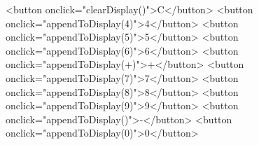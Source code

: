 \documentclass[
  letterpaper,
]{book}
\newenvironment{Shaded}{\begin{snugshade}}{\end{snugshade}}
\newcommand{\DataTypeTok}[1]{\textcolor[rgb]{0.68,0.00,0.00}{#1}}
\newcommand{\ErrorTok}[1]{\textcolor[rgb]{0.68,0.00,0.00}{#1}}
\newcommand{\KeywordTok}[1]{\textcolor[rgb]{0.00,0.23,0.31}{#1}}
\newcommand{\NormalTok}[1]{\textcolor[rgb]{0.00,0.23,0.31}{#1}}
\newcommand{\OtherTok}[1]{\textcolor[rgb]{0.00,0.23,0.31}{#1}}
\newcommand{\StringTok}[1]{\textcolor[rgb]{0.13,0.47,0.30}{#1}}
\begin{document}
\begin{tcolorbox}
\begin{Shaded}
\begin{Highlighting}[]
      \DataTypeTok{\textless{}}\KeywordTok{button} \ErrorTok{onclick}\OtherTok{=}\StringTok{"clearDisplay()"}\DataTypeTok{\textgreater{}}\NormalTok{C}\DataTypeTok{\textless{}/}\KeywordTok{button}\DataTypeTok{\textgreater{}}
      \DataTypeTok{\textless{}}\KeywordTok{button} \ErrorTok{onclick}\OtherTok{=}\StringTok{"appendToDisplay(\textquotesingle{}4\textquotesingle{})"}\DataTypeTok{\textgreater{}}\NormalTok{4}\DataTypeTok{\textless{}/}\KeywordTok{button}\DataTypeTok{\textgreater{}}
      \DataTypeTok{\textless{}}\KeywordTok{button} \ErrorTok{onclick}\OtherTok{=}\StringTok{"appendToDisplay(\textquotesingle{}5\textquotesingle{})"}\DataTypeTok{\textgreater{}}\NormalTok{5}\DataTypeTok{\textless{}/}\KeywordTok{button}\DataTypeTok{\textgreater{}}
      \DataTypeTok{\textless{}}\KeywordTok{button} \ErrorTok{onclick}\OtherTok{=}\StringTok{"appendToDisplay(\textquotesingle{}6\textquotesingle{})"}\DataTypeTok{\textgreater{}}\NormalTok{6}\DataTypeTok{\textless{}/}\KeywordTok{button}\DataTypeTok{\textgreater{}}
      \DataTypeTok{\textless{}}\KeywordTok{button} \ErrorTok{onclick}\OtherTok{=}\StringTok{"appendToDisplay(\textquotesingle{}+\textquotesingle{})"}\DataTypeTok{\textgreater{}}\NormalTok{+}\DataTypeTok{\textless{}/}\KeywordTok{button}\DataTypeTok{\textgreater{}}
      \DataTypeTok{\textless{}}\KeywordTok{button} \ErrorTok{onclick}\OtherTok{=}\StringTok{"appendToDisplay(\textquotesingle{}7\textquotesingle{})"}\DataTypeTok{\textgreater{}}\NormalTok{7}\DataTypeTok{\textless{}/}\KeywordTok{button}\DataTypeTok{\textgreater{}}
      \DataTypeTok{\textless{}}\KeywordTok{button} \ErrorTok{onclick}\OtherTok{=}\StringTok{"appendToDisplay(\textquotesingle{}8\textquotesingle{})"}\DataTypeTok{\textgreater{}}\NormalTok{8}\DataTypeTok{\textless{}/}\KeywordTok{button}\DataTypeTok{\textgreater{}}
      \DataTypeTok{\textless{}}\KeywordTok{button} \ErrorTok{onclick}\OtherTok{=}\StringTok{"appendToDisplay(\textquotesingle{}9\textquotesingle{})"}\DataTypeTok{\textgreater{}}\NormalTok{9}\DataTypeTok{\textless{}/}\KeywordTok{button}\DataTypeTok{\textgreater{}}
      \DataTypeTok{\textless{}}\KeywordTok{button} \ErrorTok{onclick}\OtherTok{=}\StringTok{"appendToDisplay(\textquotesingle{}{-}\textquotesingle{})"}\DataTypeTok{\textgreater{}}\NormalTok{{-}}\DataTypeTok{\textless{}/}\KeywordTok{button}\DataTypeTok{\textgreater{}}
      \DataTypeTok{\textless{}}\KeywordTok{button} \ErrorTok{onclick}\OtherTok{=}\StringTok{"appendToDisplay(\textquotesingle{}0\textquotesingle{})"}\DataTypeTok{\textgreater{}}\NormalTok{0}\DataTypeTok{\textless{}/}\KeywordTok{button}\DataTypeTok{\textgreater{}}

\end{Highlighting}
\end{Shaded}
\end{tcolorbox}
\end{document}
